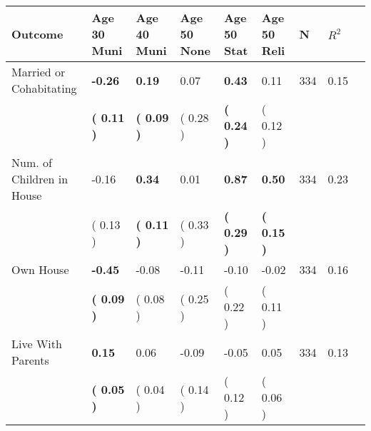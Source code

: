 \begin{tabular}{L{6.2cm} C{1.8cm} C{1.8cm} C{1.8cm} C{1.8cm} C{1.8cm} C{1.8cm} C{0.3cm} C{0.3cm}}
\toprule
 \textbf{Outcome} & \textbf{Age 30 Muni} & \textbf{Age 40 Muni} & \textbf{Age 50 None} & \textbf{Age 50 Stat} & \textbf{Age 50 Reli} & \textbf{N} & \textbf{$ R^2$} \\
\midrule
Married or Cohabitating & \textbf{    -0.26} & \textbf{     0.19} &      0.07 & \textbf{     0.43} &      0.11  & 334 &       0.15 \\ 
 & \textbf{(     0.11 )} & \textbf{(     0.09 )} & (     0.28 ) & \textbf{(     0.24 )} & (     0.12 )  & \\
Num. of Children in House &     -0.16 & \textbf{     0.34} &      0.01 & \textbf{     0.87} & \textbf{     0.50}  & 334 &       0.23 \\ 
 & (     0.13 ) & \textbf{(     0.11 )} & (     0.33 ) & \textbf{(     0.29 )} & \textbf{(     0.15 )}  & \\
Own House & \textbf{    -0.45} &     -0.08 &     -0.11 &     -0.10 &     -0.02  & 334 &       0.16 \\ 
 & \textbf{(     0.09 )} & (     0.08 ) & (     0.25 ) & (     0.22 ) & (     0.11 )  & \\
Live With Parents & \textbf{     0.15} &      0.06 &     -0.09 &     -0.05 &      0.05  & 334 &       0.13 \\ 
 & \textbf{(     0.05 )} & (     0.04 ) & (     0.14 ) & (     0.12 ) & (     0.06 )  & \\
\bottomrule
\end{tabular}
